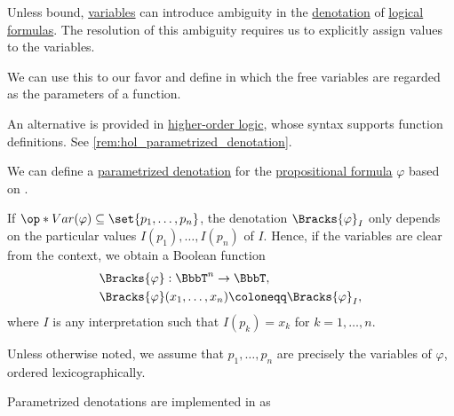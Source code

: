 \begin{concept}\label{con:parametrized_denotation}
  Unless bound, \hyperref[con:variable]{variables} can introduce ambiguity in the \hyperref[con:denotation]{denotation} of \hyperref[con:proposition]{logical formulas}. The resolution of this ambiguity requires us to explicitly assign values to the variables.

  We can use this to our favor and define  in which the free variables are regarded as the parameters of a function.
\end{concept}
\begin{comments}
  \item An alternative is provided in \hyperref[def:higher_order_logic]{higher-order logic}, whose syntax supports function definitions. See \cref{rem:hol_parametrized_denotation}.
\end{comments}

\begin{definition}\label{def:parametrized_propositional_denotation}\mimprovised
  We can define a \hyperref[con:parametrized_denotation]{parametrized denotation} for the \hyperref[def:propositional_formula]{propositional formula} \( \varphi \) based on .

  If \( \op*{Var}(\varphi) \subseteq \set{ p_1, \ldots, p_n } \), the denotation \( \Bracks{\varphi}_I \) only depends on the particular values \( I(p_1), \ldots, I(p_n) \) of \( I \). Hence, if the variables are clear from the context, we obtain a Boolean function
  \begin{equation*}
    \begin{aligned}
      &\Bracks{\varphi}: \BbbT^n \to \BbbT, \\
      &\Bracks{\varphi}(x_1, \ldots, x_n) \coloneqq \Bracks{\varphi}_I,
    \end{aligned}
  \end{equation*}
  where \( I \) is any interpretation such that \( I(p_k) = x_k \) for \( k = 1, \ldots, n \).

  Unless otherwise noted, we assume that \( p_1, \ldots, p_n \) are precisely the variables of \( \varphi \), ordered lexicographically.
\end{definition}
\begin{comments}
  \item Parametrized denotations are implemented in \cite{notebook:code} as
  \begin{CodeRefDisplay}
  \end{CodeRefDisplay}
\end{comments}

